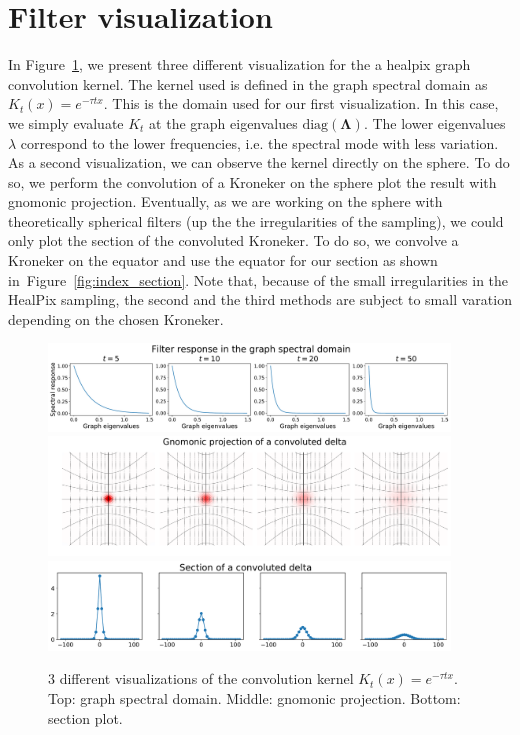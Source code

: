 \documentclass[final,twocolumn,3p,times,authoryear]{elsarticle}
\newcommand{\figref}[1]{Figure~\ref{fig:#1}}
\renewcommand{\b}[1]{{\bm{#1}}}   %
\newcommand{\1}{\b{1}}              %
\newcommand{\0}{\b{0}}              %
\newcommand{\bLambda}{\b{\Lambda}}
\begin{document}
\section{Filter visualization}
\label{sec:filter_visualization}

In \figref{gaussian_filters_visualization}, we present three different
visualization for the a healpix graph convolution kernel. The kernel used is defined in the graph spectral domain as $K_t(x)=e^{-\tau t x}$. This is the domain used for our first visualization. In this case, we simply evaluate $K_t$
at the graph eigenvalues $\text{diag}(\bLambda)$. The lower eigenvalues $\lambda$ correspond to the lower frequencies, i.e. the spectral mode with less variation. 
As a second visualization, we can observe the kernel directly on the sphere. To do so, we perform the convolution of a
Kroneker on the sphere plot the result with gnomonic projection. Eventually, as we are
working on the sphere with theoretically spherical filters (up the the irregularities of the sampling), we could only plot the section of the convoluted Kroneker. To do so, we convolve a Kroneker on the equator and use the equator for our section as shown in~\figref{index_section}. Note that, because of the small irregularities in the HealPix
sampling, the second and the third methods are subject to small varation depending on the
chosen Kroneker. 

\begin{figure}[!ht]
\centering
\includegraphics[width=0.95\textwidth]{figures/gaussian_filters_spectral.pdf}
\includegraphics[width=0.95\textwidth]{figures/gaussian_filters_gnomonic.pdf}
\includegraphics[width=0.95\textwidth]{figures/gaussian_filters_section.pdf}
\caption{3 different visualizations of the convolution kernel $K_t(x)=e^{-\tau t x}$.
Top: graph spectral domain.
Middle: gnomonic projection.
Bottom: section plot.}
\label{fig:gaussian_filters_visualization}
\end{figure}
\end{document}
